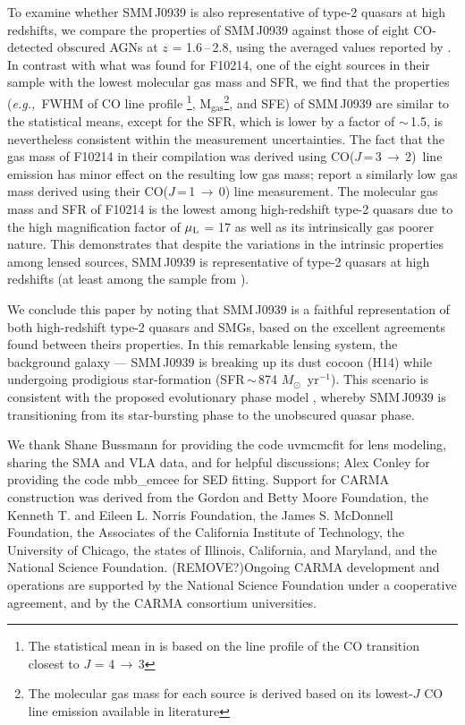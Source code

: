 \documentclass[twocolumn,apj,numberedappendix]{emulateapj}
\newcommand{\Msun}{\mbox{$M_{\odot}$}}
\newcommand{\rarr}{$\rightarrow$}
\newcommand{\CO}{\mbox{CO($J$\,=\,3\,$\rightarrow$\,2) }}
\newcommand{\eg}{{\sl e.g.,~}}
\newcommand{\pmOne}{\mbox{$^{-1}$}}
\begin{document}
To examine whether SMM\,J0939 is also representative of type-2 quasars at high redshifts, we compare the properties of SMM\,J0939
against those of eight CO-detected obscured AGNs at $z$ = 1.6\,--\,2.8, using the averaged values reported by \citet[][and references
therein]{Polletta11a}. %
In contrast with what was found for F10214, one of the eight sources in their sample with the lowest molecular gas mass and SFR, we find that the properties
(\eg FWHM of CO line profile \footnote{The statistical mean in \citet{Polletta11a} is based on the line profile of the CO transition closest to $J$ = 4\,\rarr\,3}, M$_\textrm{gas}$\footnote{The molecular gas mass for each source is derived based on its lowest-$J$ CO line emission available in literature}, and SFE) of SMM\,J0939 are similar to the statistical means, except for the SFR, which is lower by a
factor of $\sim$\,1.5, is nevertheless consistent within the measurement uncertainties. The fact that the gas mass of F10214 in their compilation was derived using \CO line emission \citep{Solomon05a} has minor effect on the resulting low gas mass; \citet{Riechers11a} report a similarly low gas mass derived using their CO($J$\,=\,1\,\rarr\,0) line measurement. 
The molecular gas mass and SFR of F10214 is the lowest among high-redshift type-2 quasars due to the high magnification factor of $\mu_{\textrm L}$ = 17 \citep{Solomon05a} as well as its intrinsically gas poorer nature. 
This demonstrates that despite the variations in the intrinsic properties among lensed sources,
 SMM\,J0939 is representative of type-2 quasars at high redshifts (at least among the sample from \citet{Polletta11a}).

We conclude this paper by noting that SMM\,J0939 is a faithful representation of both high-redshift type-2 quasars and SMGs,
based on the excellent agreements found between theirs properties. In this remarkable lensing system, the background galaxy --- SMM\,J0939 is
breaking up its dust cocoon (H14) while undergoing prodigious star-formation (SFR\,$\sim$\,874 \Msun~yr\pmOne).
This scenario is consistent with the proposed evolutionary phase model \citep{Sanders88,Coppin08a,Simpson12a}, whereby SMM\,J0939 is transitioning from its star-bursting phase to the unobscured quasar phase.

\acknowledgments
We thank Shane Bussmann for providing the code {\sc uvmcmcfit} for lens modeling, sharing the SMA and VLA data, and for helpful discussions; Alex Conley for providing the code {\sc mbb\_emcee} for SED fitting. 
Support for CARMA construction was derived from the
Gordon and Betty Moore Foundation, the Kenneth T. and Eileen
L. Norris Foundation, the James S. McDonnell Foundation, the
Associates of the California Institute of Technology, the University
of Chicago, the states of Illinois, California, and Maryland,
and the National Science Foundation. 
(REMOVE?)Ongoing CARMA development
and operations are supported by the National Science
Foundation under a cooperative agreement, and by the CARMA
consortium universities.
\newpage


\end{document}
